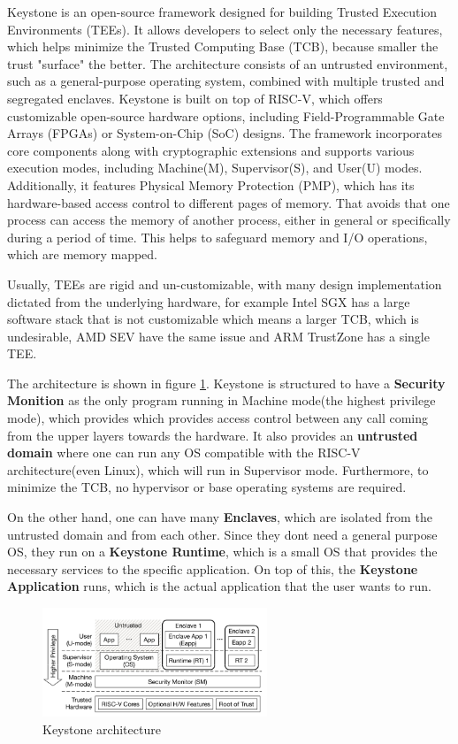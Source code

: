 Keystone is an open-source framework designed for building Trusted
Execution Environments (TEEs). It allows developers to select only the
necessary features, which helps minimize the Trusted Computing Base
(TCB), because smaller the trust "surface" the better. The
architecture consists of an untrusted environment, such as a
general-purpose operating system, combined with multiple trusted and
segregated enclaves. Keystone is built on top of RISC-V, which offers
customizable open-source hardware options, including
Field-Programmable Gate Arrays (FPGAs) or System-on-Chip (SoC)
designs. The framework incorporates core components along with
cryptographic extensions and supports various execution modes,
including Machine(M), Supervisor(S), and User(U) modes. Additionally, it
features Physical Memory Protection (PMP), which has its
hardware-based access control to different pages of memory. That
avoids that one process can access the memory of another process,
either in general or specifically during a period of time. This helps
to safeguard memory and I/O operations, which are memory mapped.

Usually, TEEs are rigid and un-customizable, with many design
implementation dictated from the underlying hardware, for example
Intel SGX has a large software stack that is not customizable which
means a larger TCB, which is undesirable, AMD SEV
have the same issue and ARM TrustZone has a single TEE. 

The architecture is shown in figure \ref{fig:keystone}. Keystone is
structured to have a \textbf{Security Monition} as the only program
running in Machine mode(the highest privilege mode), which provides
which provides access control between any call coming from the upper
layers towards the hardware. It also provides an \textbf{untrusted
domain} where one can run any OS compatible with the RISC-V 
architecture(even Linux), which will run in Supervisor mode. 
Furthermore, to minimize the TCB, no hypervisor or base operating
systems are required.

On the other hand, one can have many \textbf{Enclaves}, which are 
isolated from the untrusted domain and from each other. Since they
dont need a general purpose OS, they run on a \textbf{Keystone 
Runtime}, which is a small OS that provides the necessary services 
to the specific application. On top of this, the \textbf{Keystone 
Application} runs, which is the actual application that the user 
wants to run.

\begin{figure}[H]
  \centering
  \includegraphics[width=0.6\textwidth]{img/keystone architecture.png}
  \caption{Keystone architecture}
  \label{fig:keystone}
\end{figure}

